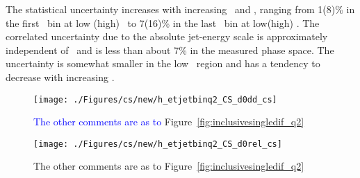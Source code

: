 The statistical uncertainty increases with increasing \etjetb~and \qsq, ranging from 1(8)\% in the first \qsq~bin at low (high) \etjetb~to 7(16)\% in the last \qsq~bin at low(high) \etjetb. The correlated uncertainty due to the absolute jet-energy scale is approximately independent of \etjetb~and is less than about 7\% in the measured phase space. The uncertainty is somewhat smaller in the low \etjetb~region and has a tendency to decrease with increasing \qsq.
\begin{figure}[p]
	\centering
		\texttt{[image: ./Figures/cs/new/h\_etjetbinq2\_CS\_d0dd\_cs]}
	\caption{\textcolor{blue}{The other comments are as to} Figure~\ref{fig:inclusivesingledif_q2}}
	\label{fig:inclusive_doubledif}
\end{figure}


\begin{figure}[p]
	\centering
		\texttt{[image: ./Figures/cs/new/h\_etjetbinq2\_CS\_d0rel\_cs]}
  \caption{The other comments are as to Figure~\ref{fig:inclusivesingledif_q2}}
	\label{fig:inclusive_doubledif_rel}
\end{figure}

